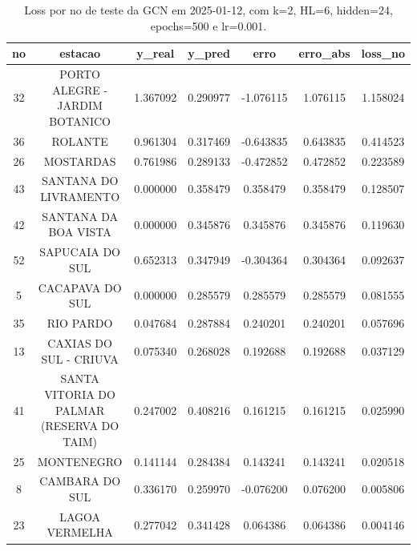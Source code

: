 \begin{table}[h]
\centering
\caption{Loss por no de teste da GCN em 2025-01-12, com k=2, HL=6, hidden=24, epochs=500 e lr=0.001.}
\label{tab:gcn_loss_k2_hl6_h24_e500_d20250112}
\begin{tabular}{ccccccc}
\toprule
no & estacao & y\_real & y\_pred & erro & erro\_abs & loss\_no \\
\midrule
32 & PORTO ALEGRE - JARDIM BOTANICO & 1.367092 & 0.290977 & -1.076115 & 1.076115 & 1.158024 \\
36 & ROLANTE & 0.961304 & 0.317469 & -0.643835 & 0.643835 & 0.414523 \\
26 & MOSTARDAS & 0.761986 & 0.289133 & -0.472852 & 0.472852 & 0.223589 \\
43 & SANTANA DO LIVRAMENTO & 0.000000 & 0.358479 & 0.358479 & 0.358479 & 0.128507 \\
42 & SANTANA DA BOA VISTA & 0.000000 & 0.345876 & 0.345876 & 0.345876 & 0.119630 \\
52 & SAPUCAIA DO SUL & 0.652313 & 0.347949 & -0.304364 & 0.304364 & 0.092637 \\
5 & CACAPAVA DO SUL & 0.000000 & 0.285579 & 0.285579 & 0.285579 & 0.081555 \\
35 & RIO PARDO & 0.047684 & 0.287884 & 0.240201 & 0.240201 & 0.057696 \\
13 & CAXIAS DO SUL - CRIUVA & 0.075340 & 0.268028 & 0.192688 & 0.192688 & 0.037129 \\
41 & SANTA VITORIA DO PALMAR (RESERVA DO TAIM) & 0.247002 & 0.408216 & 0.161215 & 0.161215 & 0.025990 \\
25 & MONTENEGRO & 0.141144 & 0.284384 & 0.143241 & 0.143241 & 0.020518 \\
8 & CAMBARA DO SUL & 0.336170 & 0.259970 & -0.076200 & 0.076200 & 0.005806 \\
23 & LAGOA VERMELHA & 0.277042 & 0.341428 & 0.064386 & 0.064386 & 0.004146 \\
\bottomrule
\end{tabular}
\end{table}
